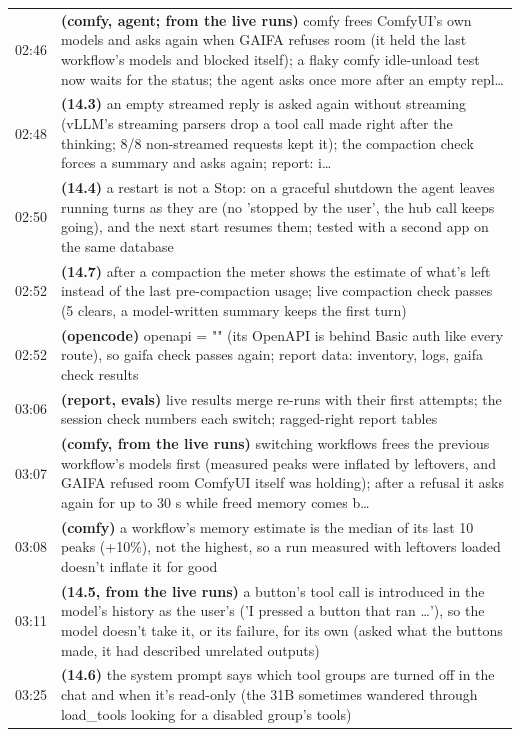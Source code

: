 \begin{longtable}{@{}l>{\raggedright\arraybackslash}p{14.2cm}@{}}
02:46 & \textbf{(comfy, agent; from the live runs)} comfy frees ComfyUI's own models and asks again when GAIFA refuses room (it held the last workflow's models and blocked itself); a flaky comfy idle-unload test now waits for the status; the agent asks once more after an empty repl… \\
02:48 & \textbf{(14.3)} an empty streamed reply is asked again without streaming (vLLM's streaming parsers drop a tool call made right after the thinking; 8/8 non-streamed requests kept it); the compaction check forces a summary and asks again; report: i… \\
02:50 & \textbf{(14.4)} a restart is not a Stop: on a graceful shutdown the agent leaves running turns as they are (no 'stopped by the user', the hub call keeps going), and the next start resumes them; tested with a second app on the same database \\
02:52 & \textbf{(14.7)} after a compaction the meter shows the estimate of what's left instead of the last pre-compaction usage; live compaction check passes (5 clears, a model-written summary keeps the first turn) \\
02:52 & \textbf{(opencode)} openapi = "" (its OpenAPI is behind Basic auth like every route), so gaifa check passes again; report data: inventory, logs, gaifa check results \\
03:06 & \textbf{(report, evals)} live results merge re-runs with their first attempts; the session check numbers each switch; ragged-right report tables \\
03:07 & \textbf{(comfy, from the live runs)} switching workflows frees the previous workflow's models first (measured peaks were inflated by leftovers, and GAIFA refused room ComfyUI itself was holding); after a refusal it asks again for up to 30 s while freed memory comes b… \\
03:08 & \textbf{(comfy)} a workflow's memory estimate is the median of its last 10 peaks (+10\%), not the highest, so a run measured with leftovers loaded doesn't inflate it for good \\
03:11 & \textbf{(14.5, from the live runs)} a button's tool call is introduced in the model's history as the user's ('I pressed a button that ran \ldots{}'), so the model doesn't take it, or its failure, for its own (asked what the buttons made, it had described unrelated outputs) \\
03:25 & \textbf{(14.6)} the system prompt says which tool groups are turned off in the chat and when it's read-only (the 31B sometimes wandered through load\_tools looking for a disabled group's tools) \\

\end{longtable}
